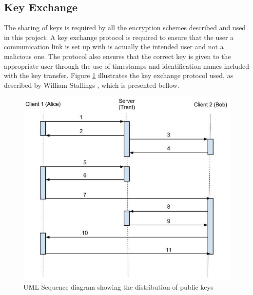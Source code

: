\documentclass[a4paper,12pt]{report}
\begin{document}
\subsection{Key Exchange}

The sharing of keys is required by all the encryption schemes described and used in this project. A key exchange protocol is required to ensure that the user a communication link is set up with is actually the intended user and not a malicious one. The protocol also ensures that the correct key is given to the appropriate user through the use of timestamps and identification names included with the key transfer. Figure \ref{fig:keyex} illustrates the key exchange protocol used, as described by William Stallings \cite{willstallings}, which is presented bellow.

\begin{figure}[htb]
\centering
\includegraphics[scale=0.4]{images/keyex.jpg}
\caption{UML Sequence diagram showing the distribution of public keys}
\label{fig:keyex}
\end{figure}
 
\end{document}
